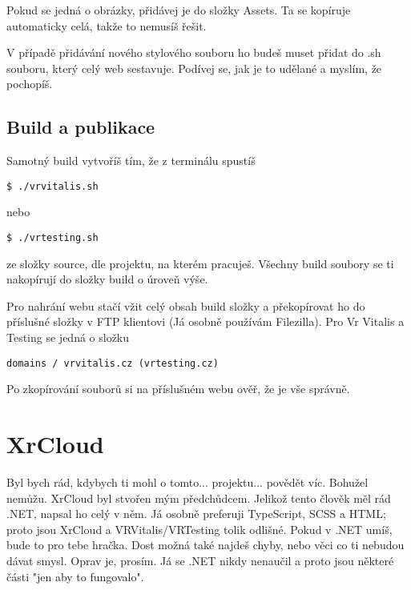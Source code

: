 \documentclass{article}
\begin{document}
Pokud se jedná o obrázky, přidávej je do složky Assets. Ta se kopíruje automaticky celá, takže to nemusíš řešit. 

V případě přidávání nového stylového souboru ho budeš muset přidat do .sh souboru, který celý web sestavuje. Podívej se, jak je to udělané a myslím, že pochopíš.

\subsection{Build a publikace}
Samotný build vytvoříš tím, že z terminálu spustíš 
\begin{lstlisting}
$ ./vrvitalis.sh
\end{lstlisting}
nebo 
\begin{lstlisting}
$ ./vrtesting.sh
\end{lstlisting}
ze složky source, dle projektu, na kterém pracuješ. Všechny build soubory se ti nakopírují do složky build o úroveň výše.

Pro nahrání webu stačí vžit celý obsah build složky a překopírovat ho do příslušné složky v FTP klientovi (Já osobně používám Filezilla). Pro Vr Vitalis a Testing se jedná o složku
\begin{lstlisting}
domains / vrvitalis.cz (vrtesting.cz)
\end{lstlisting}

Po zkopírování souborů si na příslušném webu ověř, že je vše správně.
\pagebreak

\section{XrCloud}
Byl bych rád, kdybych ti mohl o tomto... projektu... povědět víc. Bohužel nemůžu. XrCloud byl stvořen mým předchůdcem. Jelikož tento člověk měl rád .NET, napsal ho celý v něm. Já osobně preferuji TypeScript, SCSS a HTML; proto jsou XrCloud a VRVitalis/VRTesting tolik odlišné. Pokud v .NET umíš, bude to pro tebe hračka. Dost možná také najdeš chyby, nebo věci co ti nebudou dávat smysl. Oprav je, prosím. Já se .NET nikdy nenaučil a proto jsou některé části "jen aby to fungovalo".
\pagebreak
\end{document}
